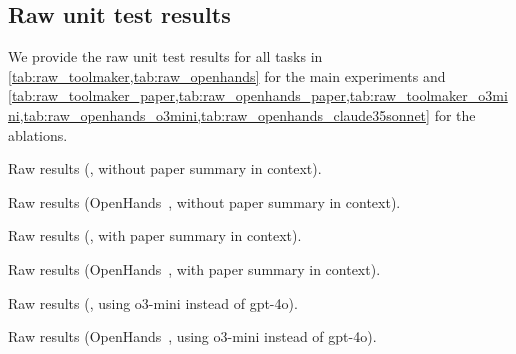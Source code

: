 \subsection{Raw unit test results}
We provide the raw unit test results for all tasks in \cref{tab:raw_toolmaker,tab:raw_openhands} for the main experiments and \cref{tab:raw_toolmaker_paper,tab:raw_openhands_paper,tab:raw_toolmaker_o3mini,tab:raw_openhands_o3mini,tab:raw_openhands_claude35sonnet} for the ablations.
\begin{table}
  \centering
  \begin{adjustbox}{max totalheight=.9\textheight}
  
  \end{adjustbox}
  \caption{Raw results (\ours, without paper summary in context).}
  \label{tab:raw_toolmaker}
\end{table}
\begin{table}
  \centering
  \begin{adjustbox}{max totalheight=.9\textheight}
  
  \end{adjustbox}
  \caption{Raw results (OpenHands~\cite{wang2024openhands}, without paper summary in context).}
  \label{tab:raw_openhands}
\end{table}
\begin{table}
  \centering
  \begin{adjustbox}{max totalheight=.9\textheight}
  
  \end{adjustbox}
  \caption{Raw results (\ours, with paper summary in context).}
  \label{tab:raw_toolmaker_paper}
\end{table}
\begin{table}
  \centering
  \begin{adjustbox}{max totalheight=.9\textheight}
  
  \end{adjustbox}
  \caption{Raw results (OpenHands~\cite{wang2024openhands}, with paper summary in context).}
  \label{tab:raw_openhands_paper}
\end{table}
\begin{table}
  \centering
  \begin{adjustbox}{max totalheight=.9\textheight}
  
  \end{adjustbox}
  \caption{Raw results (\ours, using o3-mini instead of gpt-4o).}
  \label{tab:raw_toolmaker_o3mini}
\end{table}
\begin{table}
  \centering
  \begin{adjustbox}{max totalheight=.9\textheight}
  
  \end{adjustbox}
  \caption{Raw results (OpenHands~\cite{wang2024openhands}, using o3-mini instead of gpt-4o).}
  \label{tab:raw_openhands_o3mini}
\end{table}
